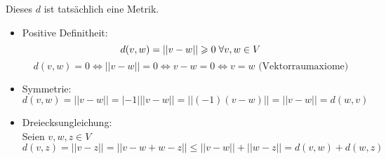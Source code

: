 \documentclass[main.tex]{subfiles}
\begin{document}
\begin{Bemerkung}
  \begin{Theorem}
    Dieses $d$ ist tatsächlich eine Metrik.
  \end{Theorem}
  \begin{Beweis}
    \begin{itemize}
      \item Positive Definitheit:
        $$d(v,w) = ||v-w|| \geqslant 0 \;\forall v,w \in V$$
        $$d(v,w) = 0 \Leftrightarrow ||v-w|| = 0 \Leftrightarrow v-w = 0 \Leftrightarrow v = w \text{ (Vektorraumaxiome)}$$
      \item Symmetrie:
        $$d(v,w) = ||v-w|| = |-1|||v-w|| = ||(-1)(v-w)|| = ||v-w|| = d(w,v)$$
      \item Dreiecksungleichung:\\
        Seien $v,w,z \in V$
        $$d(v,z) = ||v - z|| = ||v-w+w-z|| \leq ||v-w|| + ||w-z|| = d(v,w) + d(w,z)$$
    \end{itemize}
  \end{Beweis}
\end{Bemerkung}
\end{document}
